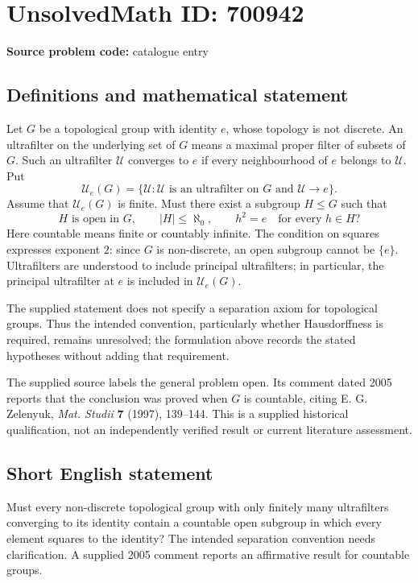\documentclass[11pt]{article}
\begin{document}
\section*{UnsolvedMath ID: 700942}
\textbf{Source problem code:} catalogue entry
\subsection{Definitions and mathematical statement}
Let \(G\) be a topological group with identity \(e\), whose topology is not discrete. An ultrafilter on the underlying set of \(G\) means a maximal proper filter of subsets of \(G\). Such an ultrafilter \(\mathcal U\) converges to \(e\) if every neighbourhood of \(e\) belongs to \(\mathcal U\). Put
\[
\mathscr U_e(G)=\{\mathcal U:\mathcal U\text{ is an ultrafilter on }G\text{ and }\mathcal U\to e\}.
\]
Assume that \(\mathscr U_e(G)\) is finite. Must there exist a subgroup \(H\leq G\) such that
\[
H\text{ is open in }G,\qquad |H|\leq\aleph_0,\qquad h^2=e\quad\text{for every }h\in H?
\]
Here countable means finite or countably infinite. The condition on squares expresses exponent \(2\): since \(G\) is non-discrete, an open subgroup cannot be \(\{e\}\). Ultrafilters are understood to include principal ultrafilters; in particular, the principal ultrafilter at \(e\) is included in \(\mathscr U_e(G)\).

The supplied statement does not specify a separation axiom for topological groups. Thus the intended convention, particularly whether Hausdorffness is required, remains unresolved; the formulation above records the stated hypotheses without adding that requirement.

The supplied source labels the general problem open. Its comment dated 2005 reports that the conclusion was proved when \(G\) is countable, citing E. G. Zelenyuk, \emph{Mat. Studii} \textbf{7} (1997), 139--144. This is a supplied historical qualification, not an independently verified result or current literature assessment.
\subsection{Short English statement}
Must every non-discrete topological group with only finitely many ultrafilters converging to its identity contain a countable open subgroup in which every element squares to the identity? The intended separation convention needs clarification. A supplied 2005 comment reports an affirmative result for countable groups.
\end{document}

